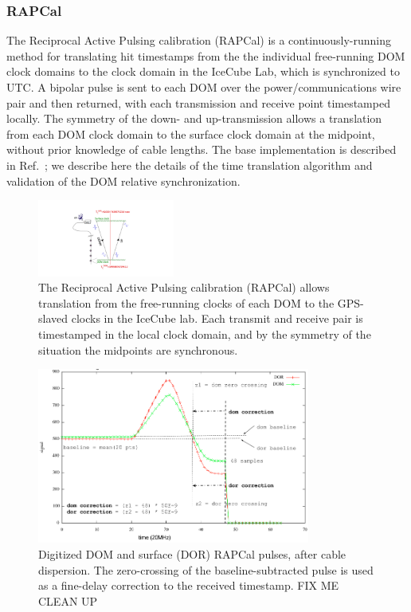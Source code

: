 \subsubsection{\label{sect:dom:rapcal}RAPCal}

The Reciprocal Active Pulsing calibration (RAPCal) is a
continuously-running method for translating hit timestamps from the the
individual free-running DOM clock domains to the clock domain in the
IceCube Lab, which is synchronized to UTC.  A bipolar pulse is sent to each
DOM over the power/communications wire pair and then returned, with each
transmission and receive point timestamped locally.  The symmetry of the down-
and up-transmission allows a translation from each DOM clock domain to the
surface clock domain at the midpoint, without prior knowledge of cable lengths.
The base implementation is described in Ref.~\cite{ICECUBE:DAQ}; we
describe here the details of the time translation algorithm and validation
of the DOM relative synchronization. 

\begin{figure}[!h]
 \centering
 \includegraphics[width=0.4\textwidth]{graphics/dom/rapcal/rapcal_symmetry.pdf}
 \caption{The Reciprocal Active Pulsing calibration (RAPCal) allows
   translation from the free-running clocks of each DOM to the GPS-slaved
   clocks in the IceCube lab.  Each transmit and receive pair is
   timestamped in the local clock domain, and by the symmetry of the
   situation the midpoints are synchronous.}
 \label{fig:rapcal_symmetry}
\end{figure}

\begin{figure}[h]
 \centering
 \includegraphics[width=0.8\textwidth]{graphics/dom/rapcal/zero_crossing.png}
 \caption{Digitized DOM and surface (DOR) RAPCal pulses, after cable
   dispersion.  The zero-crossing of the baseline-subtracted pulse is used as a
   fine-delay correction to the received timestamp.  FIX ME CLEAN UP}
 \label{fig:rapcal_zero_crossing}
\end{figure}

